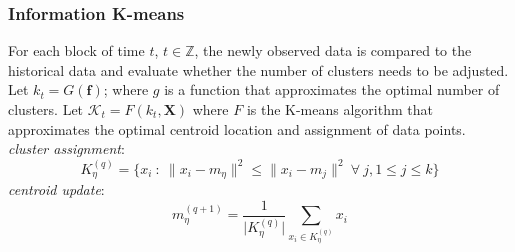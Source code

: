 \subsubsection*{Information K-means}
For each block of time $t$, $t \in \mathbb{Z}$, the newly observed data is compared to the historical data and evaluate whether the number of clusters needs to be adjusted.\\
Let $k_{t} = G(\textbf{f})$; where $g$ is a function that approximates the optimal number of clusters.
Let $\mathcal{K}_{t} = F(k_{t}, \textbf{X})$ where $F$ is the K-means algorithm that approximates the optimal centroid location and assignment of data points.\\

\noindent\textit{cluster assignment}:
\begin{equation}
K_{\eta}^{(q)} = \{x_i~:~\lVert x_i - m_{\eta} \rVert^{2} \leq \lVert x_i - m_{j} \rVert^{2}~\forall~j, 1 \leq j \leq k\}
\end{equation}
\textit{centroid update}:
\begin{equation}
m_{\eta}^{(q + 1)} = \frac{1}{\lvert K_{\eta}^{(q)}\rvert}\sum_{x_{i} \in K_{\eta}^{(q)}} x_{i}
\end{equation}
